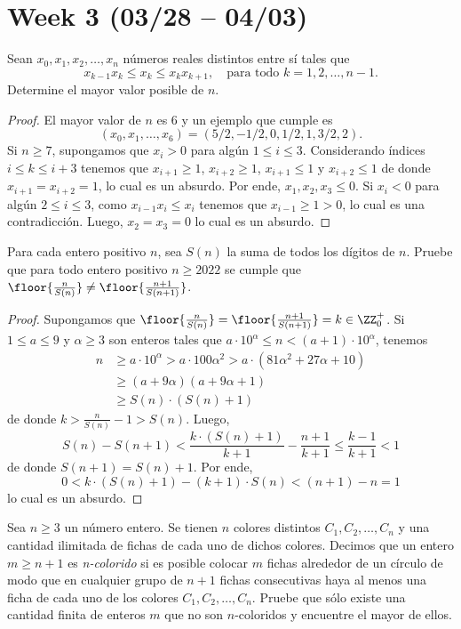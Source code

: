 \section{Week 3 (03/28 -- 04/03)}

\begin{probEG}
	Sean $x_0,x_1,x_2,\dots,x_n$ números reales distintos entre sí tales que
	\[x_{k-1}x_k\le x_k\le x_kx_{k+1},\quad\text{para todo }k=1,2,\dots,n-1.\]
	Determine el mayor valor posible de $n$.
\end{probEG}

\begin{proof}
	El mayor valor de $n$ es $6$ y un ejemplo que cumple es
	\[(x_0,x_1,\dots,x_6)=(5/2,-1/2,0,1/2,1,3/2,2).\]
	Si $n\ge 7$, supongamos que $x_i>0$ para algún $1\le i\le 3$. Considerando índices $i\le k\le i+3$ tenemos que $x_{i+1}\ge 1$, $x_{i+2}\ge 1$, $x_{i+1}\le 1$ y $x_{i+2}\le 1$ de donde $x_{i+1}=x_{i+2}=1$, lo cual es un absurdo. Por ende, $x_1,x_2,x_3\le 0$. Si $x_i<0$ para algún $2\le i\le 3$, como $x_{i-1}x_i\le x_i$ tenemos que $x_{i-1}\ge 1>0$, lo cual es una contradicción. Luego, $x_2=x_3=0$ lo cual es un absurdo.
\end{proof}

\begin{probEG}
	Para cada entero positivo $n$, sea $S(n)$ la suma de todos los dígitos de $n$. Pruebe que para todo entero positivo $n\ge 2022$ se cumple que $\floor{\frac{n}{S(n)}}\ne\floor{\frac{n+1}{S(n+1)}}$.
\end{probEG}

\begin{proof}
	Supongamos que $\floor{\frac{n}{S(n)}}=\floor{\frac{n+1}{S(n+1)}}=k\in\ZZ^+_0$. Si $1\le a\le 9$ y $\alpha\ge 3$ son enteros tales que $a\cdot 10^\alpha\le n<(a+1)\cdot 10^\alpha$, tenemos
	\begin{align*}
		n
		&\ge a\cdot 10^\alpha>a\cdot 100\alpha^2>a\cdot(81\alpha^2+27\alpha+10)\\
		&\ge (a+9\alpha)(a+9\alpha+1)\\
		&\ge S(n)\cdot(S(n)+1)
	\end{align*} 
	de donde $k>\frac{n}{S(n)}-1>S(n)$. Luego,
	\[S(n)-S(n+1)<\frac{k\cdot (S(n)+1)}{k+1}-\frac{n+1}{k+1}\le\frac{k-1}{k+1}<1\]
	de donde $S(n+1)=S(n)+1$. Por ende,
	\[0<k\cdot(S(n)+1)-(k+1)\cdot S(n)<(n+1)-n=1\]
	lo cual es un absurdo.
\end{proof}

\begin{probEG}
	Sea $n\ge 3$ un número entero. Se tienen $n$ colores distintos $C_1,C_2,\dots,C_n$ y una cantidad ilimitada de fichas de cada uno de dichos colores. Decimos que un entero $m\ge n+1$ es \emph{n-colorido} si es posible colocar $m$ fichas alrededor de un círculo de modo que en cualquier grupo de $n+1$ fichas consecutivas haya al menos una ficha de cada uno de los colores $C_1,C_2,\dots,C_n$. Pruebe que sólo existe una cantidad finita de enteros $m$ que no son $n$-coloridos y encuentre el mayor de ellos.
\end{probEG}

